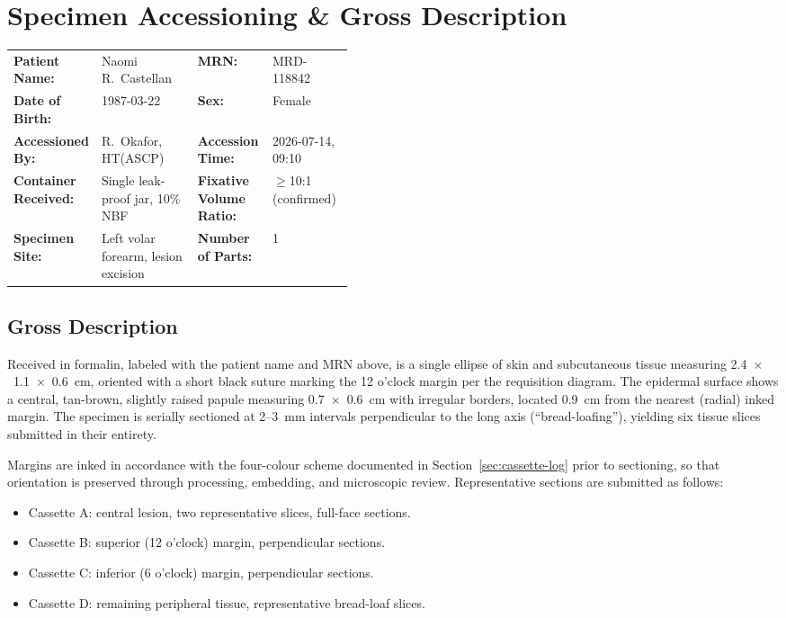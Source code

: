 \section{Specimen Accessioning \& Gross Description}

\begin{plainbox}
\sffamily\small
\renewcommand{\arraystretch}{1.3}
\begin{tabularx}{\linewidth}{@{}p{0.22\linewidth} X p{0.22\linewidth} X@{}}
  \textbf{Patient Name:} & Naomi R.\ Castellan & \textbf{MRN:} & MRD-118842 \\
  \textbf{Date of Birth:} & 1987-03-22 & \textbf{Sex:} & Female \\
  \textbf{Accessioned By:} & R.\ Okafor, HT(ASCP) & \textbf{Accession Time:} & 2026-07-14, 09:10 \\
  \textbf{Container Received:} & Single leak-proof jar, 10\% NBF & \textbf{Fixative Volume Ratio:} & $\geq$10:1 (confirmed) \\
  \textbf{Specimen Site:} & Left volar forearm, lesion excision & \textbf{Number of Parts:} & 1 \\
\end{tabularx}
\end{plainbox}

\vspace{6pt}

\subsection{Gross Description}
Received in formalin, labeled with the patient name and MRN above, is a single ellipse of
skin and subcutaneous tissue measuring 2.4~$\times$~1.1~$\times$~0.6~cm, oriented with a
short black suture marking the 12 o'clock margin per the requisition diagram. The
epidermal surface shows a central, tan-brown, slightly raised papule measuring
0.7~$\times$~0.6~cm with irregular borders, located 0.9~cm from the nearest (radial)
inked margin. The specimen is serially sectioned at 2--3~mm intervals perpendicular to
the long axis (``bread-loafing''), yielding six tissue slices submitted in their entirety.

\vspace{4pt}
Margins are inked in accordance with the four-colour scheme documented in
Section~\ref{sec:cassette-log} prior to sectioning, so that orientation is preserved
through processing, embedding, and microscopic review. Representative sections are
submitted as follows:

\vspace{4pt}
\begin{itemize}
  \item Cassette A: central lesion, two representative slices, full-face sections.
  \item Cassette B: superior (12 o'clock) margin, perpendicular sections.
  \item Cassette C: inferior (6 o'clock) margin, perpendicular sections.
  \item Cassette D: remaining peripheral tissue, representative bread-loaf slices.
\end{itemize}


